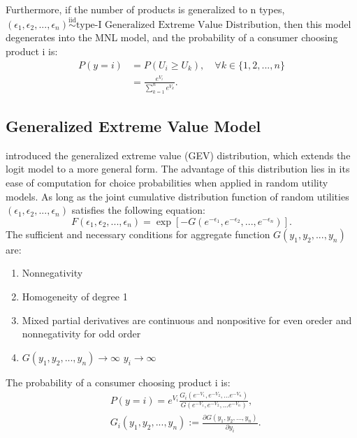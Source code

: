 \documentclass[12pt]{article}
\theoremstyle{definition}
\begin{document}
\begin{sloppypar}
Furthermore, if the number of products is generalized to n types, $(\epsilon_{1}, \epsilon_{2}, ..., \epsilon_{n}) \overset{\mathrm{iid}}{\sim} \text{type-I Generalized Extreme Value Distribution}$, then this model degenerates into the MNL model, and the probability of a consumer choosing product i is:
\begin{align*}
    P(y = i) &= P(U_i \geq U_k), \quad \forall k \in \{1, 2, ...,n\}\\
    &= \frac{e^{V_{i}}}{\sum_{k=1}^{n} e^{V_{k}}}.
\end{align*}

\subsection{Generalized Extreme Value Model}
\textcite{mcfadden1977} introduced the generalized extreme value (GEV) distribution, which extends the logit model to a more general form. The advantage of this distribution lies in its ease of computation for choice probabilities when applied in random utility models. As long as the joint cumulative distribution function of random utilities $(\epsilon_{1}, \epsilon_{2}, ..., \epsilon_{n})$ satisfies the following equation:
\begin{equation}
    F(\epsilon_{1}, \epsilon_{2}, ..., \epsilon_{n}) = \exp[-G(e^{-\epsilon_{1}}, e^{-\epsilon_{2}}, ..., e^{-\epsilon_{n}})].
\end{equation}
The sufficient and necessary conditions for aggregate function $G(y_1, y_2, ..., y_n)$ are:
\begin{enumerate}
    \item Nonnegativity
    \item Homogeneity of degree 1
    \item Mixed partial derivatives are continuous and nonpositive for even oreder and nonnegativity for odd order
    \item  $G(y_1, y_2, ..., y_n) \rightarrow \infty$  $y_i \rightarrow \infty$
\end{enumerate}

The probability of a consumer choosing product i is:
\begin{align}\label{eqn:the property of GEV model}
    &P(y=i) = e^{V_{i}}\frac{G_i(e^{-V_1},e^{-V_2},...e^{-V_n})}{G(e^{-V_1},e^{-V_2},...e^{-V_n})},\\
    &G_i(y_1, y_2, ..., y_n) := \frac{\partial G(y_1, y_2, ..., y_n)}{\partial y_i}. \nonumber
\end{align}


\end{sloppypar}
\end{document}
